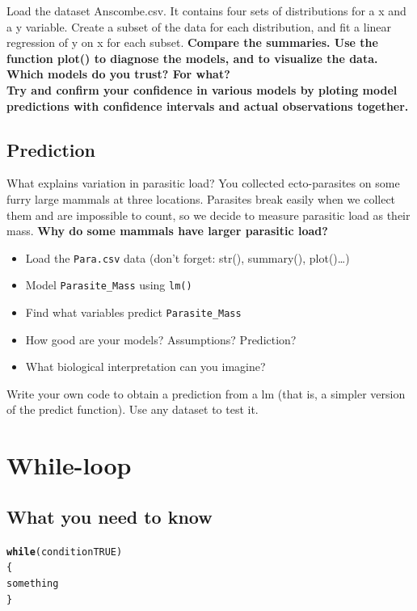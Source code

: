 \documentclass[12pt,a4paper]{scrartcl}\usepackage[]{graphicx}\usepackage[]{color}
\makeatletter
\newcommand{\hlkwd}[1]{\textcolor[rgb]{0.737,0.353,0.396}{\textbf{#1}}}%
\newenvironment{kframe}{%
 \def\at@end@of@kframe{}%
 \ifinner\ifhmode%
  \def\at@end@of@kframe{\end{minipage}}%
  \begin{minipage}{\columnwidth}%
 \fi\fi%
 \def\FrameCommand##1{\hskip\@totalleftmargin \hskip-\fboxsep
 \colorbox{shadecolor}{##1}\hskip-\fboxsep
     \hskip-\linewidth \hskip-\@totalleftmargin \hskip\columnwidth}%
 \MakeFramed {\advance\hsize-\width
   \@totalleftmargin\z@ \linewidth\hsize
   \@setminipage}}%
 {\par\unskip\endMakeFramed%
 \at@end@of@kframe}
\newenvironment{knitrout}{}{} %
\makeatother
\begin{document}
\begin{Exercise}[difficulty=2]
Load the dataset Anscombe.csv. It contains four sets of distributions for a x and a y variable. Create a subset of the data for each distribution, and fit a linear regression of y on x for each subset. 
\textbf{Compare the summaries. Use the function plot() to diagnose the models, and to visualize the data. Which models do you trust? For what?\\ Try and confirm your confidence in various models by ploting model predictions with confidence intervals and actual observations together.} 

\end{Exercise}


\subsection{Prediction}
  \begin{Exercise}[difficulty=2]
  What explains variation in parasitic load?
  You collected ecto-parasites on some furry large mammals at three locations. Parasites break easily when we collect them and are impossible to count, so we decide to measure parasitic load as their mass. \textbf{Why do some mammals have larger parasitic load?} 
    \begin{itemize}
      \item Load the \texttt{Para.csv} data (don't forget: str(), summary(), plot()\dots)
      \item Model \verb+Parasite_Mass+ using \texttt{lm()}
      \item Find what variables predict \verb+Parasite_Mass+
      \item How good are your models? Assumptions? Prediction?
      \item What biological interpretation can you imagine?
      \end{itemize}
    \end{Exercise}

\begin{Exercise}[difficulty=3]
Write your own code to obtain a prediction from a lm (that is, a simpler version of the predict function). Use any dataset to test it.
\end{Exercise}

\section{While-loop}

\subsection{What you need to know}
\begin{knitrout}
\color{fgcolor}\begin{kframe}
\begin{alltt}
    \hlkwd{while}(condition TRUE)
    \{
      something
    \}
\end{alltt}
\end{kframe}
\end{knitrout}
  
\end{document}
